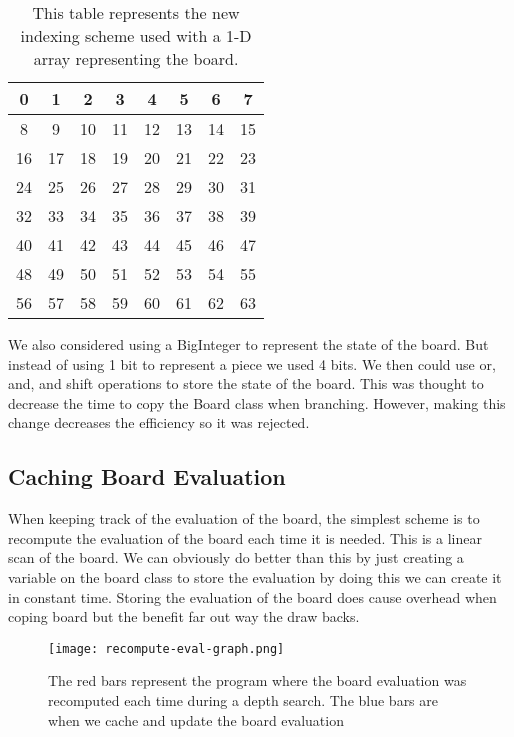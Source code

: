 \documentclass[sigconf]{acmart}
\begin{document}
\begin{table}[H]
    \renewcommand{\arraystretch}{1.5}
    \setlength{\arrayrulewidth}{1pt}
    \setlength{\tabcolsep}{5pt}
    \begin{tabular}{|c|c|c|c|c|c|c|c|}
        \hline
        0  & 1  & 2  & 3  & 4  & 5  & 6  & 7  \\
        \hline
        8  & 9  & 10  & 11  & 12  & 13  & 14  & 15  \\
        \hline
        16  & 17  & 18  & 19  & 20  & 21  & 22  & 23  \\
        \hline
        24  & 25  & 26  & 27  & 28  & 29  & 30  & 31  \\
        \hline
        32  & 33  & 34  & 35  & 36  & 37  & 38  & 39  \\
        \hline
        40  & 41  & 42  & 43  & 44  & 45  & 46  & 47  \\
        \hline
        48  & 49  & 50  & 51  & 52  & 53  & 54  & 55  \\
        \hline
        56  & 57  & 58  & 59  & 60  & 61  & 62  & 63  \\
        \hline
    \end{tabular}
    \caption{This table represents the new indexing scheme used with a 1-D array representing the board.}
    \label{tab:example_table}
\end{table}

We also considered using a BigInteger to represent the state of the board.
But instead of using 1 bit to represent a piece we used 4 bits.
We then could use or, and, and shift operations to store the state of the board.
This was thought to decrease the time to copy the Board class when branching.
However, making this change decreases the efficiency so it was rejected.

\subsection{Caching Board Evaluation}
When keeping track of the evaluation of the board, the simplest scheme is to recompute the evaluation of the board each time it is needed.
This is a linear scan of the board.
We can obviously do better than this by just creating a variable on the board class to store the evaluation by doing this we can create it in constant time.
Storing the evaluation of the board does cause overhead when coping board but the benefit far out way the draw backs.

\begin{figure}[H]
    \centering
    \texttt{[image: recompute-eval-graph.png]}
    \caption{The red bars represent the program where the board evaluation was recomputed each time during a depth search. The blue bars are when we cache and update the board evaluation}
    \label{fig:eval-speedup}
\end{figure}
\end{document}
